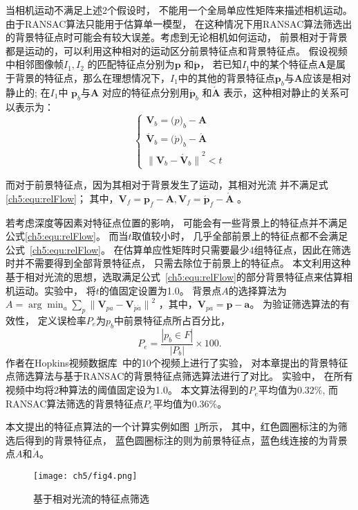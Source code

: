 当相机运动不满足上述2个假设时， 不能用一个全局单应性矩阵来描述相机运动。由于RANSAC算法只能用于估算单一模型， 在这种情况下用RANSAC算法筛选出的背景特征点时可能会有较大误差。考虑到无论相机如何运动， 前景相对于背景都是运动的，可以利用这种相对的运动区分前景特征点和背景特征点。 假设视频中相邻图像帧$I_1,I_2$ 的匹配特征点分别为$\mathbf{p}$ 和$\mathbf{\acute{p}}$， 若已知$I_1$中的某个特征点$\mathbf{A}$是属于背景的特征点，那么在理想情况下，$I_1$中的其他的背景特征点$\mathbf{p}_b$与$\mathbf{A}$应该是相对静止的; 在$I_1$中 $\mathbf{p}_b$与$\mathbf{A}$ 对应的特征点分别用$\mathbf{\acute{p}}_b$ 和$\mathbf{\acute{A}}$ 表示，这种相对静止的关系可以表示为：
\begin{equation}
\label{ch5:equ:relFlow}
\begin{cases}
  \mathbf{V}_b = \mathbf(p)_b - \mathbf{A}  \\
   \mathbf{\acute{V}}_b = \mathbf(\acute{p})_b - \mathbf{\acute{A}} \\
{\|\mathbf{V}_b-\mathbf{\acute{V}}_b\|}^2 < t
\end{cases}
\end{equation}
	 	
而对于前景特征点，因为其相对于背景发生了运动，其相对光流 并不满足式\ref{ch5:equ:relFlow}； 其中，$ \mathbf{V}_f = \mathbf{p}_f - \mathbf{A},\mathbf{V}_f = \mathbf{\acute{p}}_f - \mathbf{\acute{A}}$  。\par
若考虑深度等因素对特征点位置的影响， 可能会有一些背景上的特征点并不满足公式\ref{ch5:equ:relFlow}。 而当$t$取值较小时， 几乎全部前景上的特征点都不会满足公式~\ref{ch5:equ:relFlow}。 在估算单应性矩阵时只需要最少4组特征点，因此在筛选时并不需要得到全部背景特征点， 只需去除位于前景上的特征点。 本文利用这种基于相对光流的思想，选取满足公式~\ref{ch5:equ:relFlow}的部分背景特征点来估算相机运动。实验中， 将$t$的值固定设置为1.0。 背景点$A$的选择算法为$A = \arg \min_{a}\sum_{p}{\|\mathbf{V}_{pa} - \mathbf{V}_{\acute{p}\acute{a}}\|}^2$ ，其中，$ \mathbf{V}_{pa} = \mathbf{p} - \mathbf{a}$。 为验证筛选算法的有效性， 定义误检率$P_e$为$p_b$中前景特征点所占百分比，$$P_e= \frac{|p_b \in F |}{|P_b|} \times 100. $$
作者在Hopkins视频数据库~\cite{HopKinsDataSet}中的10个视频上进行了实验， 对本章提出的背景特征点筛选算法与基于RANSAC的背景特征点筛选算法进行了对比。 实验中， 在所有视频中均将2种算法的阈值固定设为1.0。 本文算法得到的$P_e$平均值为$0.32 \%$, 而RANSAC算法筛选的背景特征点$P_e$平均值为$0.36\%$。 \par
本文提出的特征点算法的一个计算实例如图~\ref{ch5:fig:fpFilter}所示， 其中，红色圆圈标注的为筛选后得到的背景特征点， 蓝色圆圈标注的则为前景特征点，蓝色线连接的为背景点$A$和$\acute{A}$。\par
\begin{figure}[htb]
  \centering
  \texttt{[image: ch5/fig4.png]}
  \caption{基于相对光流的特征点筛选}\label{ch5:fig:fpFilter}
\end{figure}


